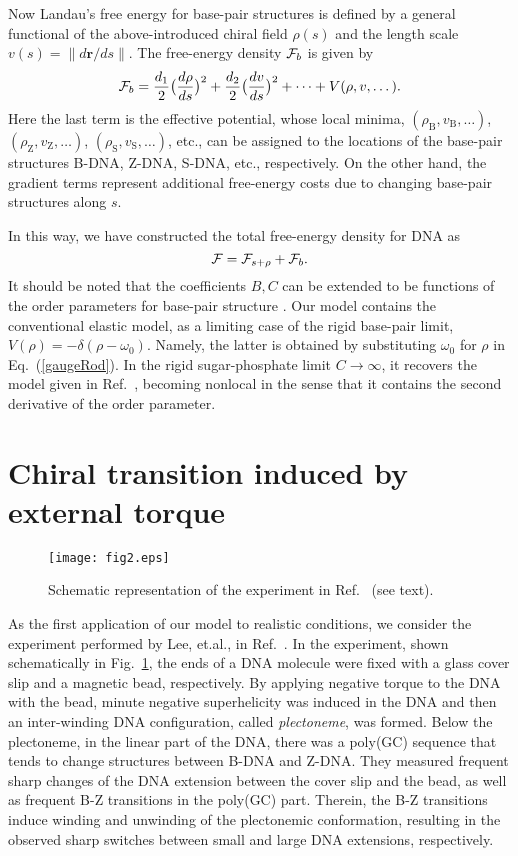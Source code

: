 \documentclass[pre,showpacs,twocolumn,superscriptaddress]{revtex4}
\newcommand{\cF}{ {\cal F} }
\begin{document}
Now Landau's free energy for base-pair structures 
is defined by a general functional 
of the above-introduced chiral field $\rho(s)$
and the length scale $v(s)=\|d{\bm r}/ds\|$. 
The free-energy density $\cF_b$ is given by
\begin{equation}
\cF_{b} = 
\frac{d_1}{2}\big(\frac{d\rho}{ds}\big)^2
+\frac{d_2}{2}\big(\frac{dv}{ds}\big)^2+\dots
+V(\rho,v,\dots).
\label{general}
\end{equation}
Here the last term is the effective potential,
whose local minima,
$(\rho_\text{B},v_\text{B},\dots)$,
$(\rho_\text{Z},v_\text{Z},\dots)$,
$(\rho_\text{S},v_\text{S},\dots)$, etc.,
 can be assigned to 
the locations of the base-pair structures B-DNA, Z-DNA, S-DNA, etc.,
respectively.
On the other hand,
the gradient terms represent additional free-energy costs 
due to changing base-pair structures along $s$.

In this way, we have constructed the total free-energy density for DNA
as 
\begin{equation}
\cF=\cF_{s+\rho}+\cF_b.
\end{equation}
It should be noted that
the coefficients $B, C$ can be extended 
to be functions of the order parameters for base-pair structure \cite{endnote}.
Our model contains the conventional elastic model,
as a limiting case of  the rigid base-pair limit, 
  $V(\rho) = -\delta (\rho-\omega_0)$.
Namely,
the latter is obtained by
substituting $\omega_0$ for $\rho$ in
Eq.~(\ref{gaugeRod}).
In the rigid sugar-phosphate limit $C \to \infty$,
it recovers the model given in Ref.~\cite{phi4},
becoming nonlocal in the sense that
it contains the second derivative of the order parameter.


\section{Chiral transition induced by external torque } 
\begin{figure}[b]
\texttt{[image: fig2.eps]}\\
\caption{
Schematic representation of the experiment in Ref.~\cite{BZtrans}
(see text). 
}
\label{experiment}
\end{figure}


As the first application of our model to realistic conditions,
we consider the experiment performed by Lee, et.al., in  Ref.~\cite{BZtrans}.
In the experiment, shown schematically in Fig.~\ref{experiment}, 
the ends of a DNA molecule were fixed with 
a glass cover slip and a magnetic bead, respectively.
By applying negative torque to the DNA with the bead,
minute negative superhelicity
was induced in the DNA
and then
an inter-winding DNA configuration, called {\em plectoneme}, was formed.
Below the plectoneme, in the linear part of the DNA, there was
a poly(GC) sequence that tends to change structures between B-DNA and Z-DNA.
They measured frequent sharp changes of 
the DNA extension between the cover slip and the bead, as well as
frequent B-Z transitions in the poly(GC) part.
Therein,
the B-Z transitions induce winding and unwinding of the plectonemic
conformation,
resulting in the observed sharp switches between small and large DNA extensions, 
respectively.
\end{document}
